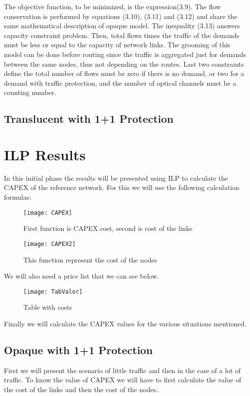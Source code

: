 The objective function, to be minimized, is the expression(3.9). The flow conservation is performed by equations (3.10), (3.11) and (3.12) and share the same mathematical description of opaque model. The inequality (3.13) answers capacity constraint problem. Then, total flows times the traffic of the demands must be less or equal to the capacity of network links. The grooming of this model can be done before routing since the traffic is aggregated just for demands between the same nodes, thus not depending on the routes. Last two constraints define the total number of flows must be zero if there is no demand, or two for a demand with traffic protection, and the number of optical channels must be a counting number.

\subsection{Translucent with 1+1 Protection}

\section{ILP Results}
In this initial phase the results will be presented using ILP to calculate the CAPEX of the reference network.
For this we will use the following calculation formulas:

\begin{figure}[h!]
  \centering
  \texttt{[image: CAPEX]}
  \caption{First function is CAPEX cost, second is cost of the links}
\end{figure}

\begin{figure}[h!]
  \centering
  \texttt{[image: CAPEX2]}
  \caption{This function represent the cost of the nodes}
\end{figure}

We will also need a price list that we can see below.

\begin{figure}
  \centering
  \texttt{[image: TabValor]}
  \caption{Table with costs}
\end{figure}

Finally we will calculate the CAPEX values for the various situations mentioned.

\subsection{Opaque with 1+1 Protection}
First we will present the scenario of little traffic and then in the case of a lot of traffic.
To know the value of CAPEX we will have to first calculate the value of the cost of the links and then the cost of the nodes.

